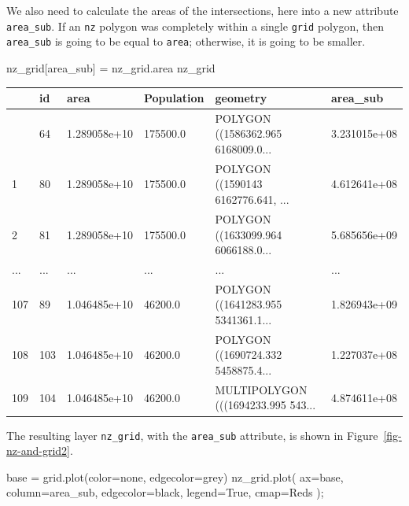 \documentclass[
  letterpaper,
]{krantz}
\newenvironment{Shaded}{\begin{snugshade}}{\end{snugshade}}
\newcommand{\NormalTok}[1]{\textcolor[rgb]{0.00,0.23,0.31}{#1}}
\newcommand{\OperatorTok}[1]{\textcolor[rgb]{0.37,0.37,0.37}{#1}}
\newcommand{\StringTok}[1]{\textcolor[rgb]{0.13,0.47,0.30}{#1}}
\newcommand{\VariableTok}[1]{\textcolor[rgb]{0.07,0.07,0.07}{#1}}
\begin{document}
We also need to calculate the areas of the intersections, here into a
new attribute \texttt{\textquotesingle{}area\_sub\textquotesingle{}}. If
an \texttt{nz} polygon was completely within a single \texttt{grid}
polygon, then \texttt{area\_sub} is going to be equal to \texttt{area};
otherwise, it is going to be smaller.

\begin{Shaded}
\begin{Highlighting}[]
\NormalTok{nz\_grid[}\StringTok{\textquotesingle{}area\_sub\textquotesingle{}}\NormalTok{] }\OperatorTok{=}\NormalTok{ nz\_grid.area}
\NormalTok{nz\_grid}
\end{Highlighting}
\end{Shaded}

\begin{longtable}[]{@{}llllll@{}}
\toprule\noalign{}
& id & area & Population & geometry & area\_sub \\
\midrule\noalign{}
\endhead
\bottomrule\noalign{}
\endlastfoot
0 & 64 & 1.289058e+10 & 175500.0 & POLYGON ((1586362.965 6168009.0... &
3.231015e+08 \\
1 & 80 & 1.289058e+10 & 175500.0 & POLYGON ((1590143 6162776.641, ... &
4.612641e+08 \\
2 & 81 & 1.289058e+10 & 175500.0 & POLYGON ((1633099.964 6066188.0... &
5.685656e+09 \\
... & ... & ... & ... & ... & ... \\
107 & 89 & 1.046485e+10 & 46200.0 & POLYGON ((1641283.955 5341361.1... &
1.826943e+09 \\
108 & 103 & 1.046485e+10 & 46200.0 & POLYGON ((1690724.332 5458875.4...
& 1.227037e+08 \\
109 & 104 & 1.046485e+10 & 46200.0 & MULTIPOLYGON (((1694233.995 543...
& 4.874611e+08 \\
\end{longtable}

The resulting layer \texttt{nz\_grid}, with the \texttt{area\_sub}
attribute, is shown in Figure~\ref{fig-nz-and-grid2}.

\begin{Shaded}
\begin{Highlighting}[]
\NormalTok{base }\OperatorTok{=}\NormalTok{ grid.plot(color}\OperatorTok{=}\StringTok{\textquotesingle{}none\textquotesingle{}}\NormalTok{, edgecolor}\OperatorTok{=}\StringTok{\textquotesingle{}grey\textquotesingle{}}\NormalTok{)}
\NormalTok{nz\_grid.plot(}
\NormalTok{    ax}\OperatorTok{=}\NormalTok{base, }
\NormalTok{    column}\OperatorTok{=}\StringTok{\textquotesingle{}area\_sub\textquotesingle{}}\NormalTok{, }
\NormalTok{    edgecolor}\OperatorTok{=}\StringTok{\textquotesingle{}black\textquotesingle{}}\NormalTok{,}
\NormalTok{    legend}\OperatorTok{=}\VariableTok{True}\NormalTok{, }
\NormalTok{    cmap}\OperatorTok{=}\StringTok{\textquotesingle{}Reds\textquotesingle{}}
\NormalTok{)}\OperatorTok{;}
\end{Highlighting}
\end{Shaded}
\end{document}
